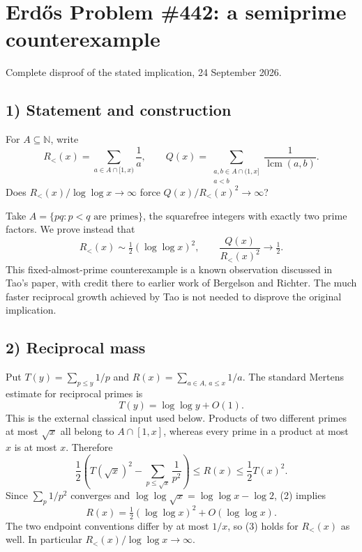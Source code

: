 \section{Erd\H{o}s Problem \#442: a semiprime counterexample}
\noindent Complete disproof of the stated implication, 24 September 2026.

\subsection*{1) Statement and construction}
For $A\subseteq\mathbb N$, write
\[R_<(x)=\sum_{a\in A\cap[1,x)}\frac1a,\qquad
Q(x)=\sum_{\substack{a,b\in A\cap(1,x]\\a<b}}\frac1{\operatorname{lcm}(a,b)}.\]
Does $R_<(x)/\log\log x\to\infty$ force $Q(x)/R_<(x)^2\to\infty$?

Take $A=\{pq:p<q\text{ are primes}\}$, the squarefree integers with exactly two prime factors. We prove instead that
\[R_<(x)\sim\tfrac12(\log\log x)^2,
\qquad \frac{Q(x)}{R_<(x)^2}\longrightarrow\tfrac12.\tag{1}\]
This fixed-almost-prime counterexample is a known observation discussed in Tao's paper, with credit there to earlier work of Bergelson and Richter. The much faster reciprocal growth achieved by Tao is not needed to disprove the original implication.

\subsection*{2) Reciprocal mass}
Put $T(y)=\sum_{p\le y}1/p$ and $R(x)=\sum_{a\in A,\,a\le x}1/a$. The standard Mertens estimate for reciprocal primes is
\[T(y)=\log\log y+O(1).\tag{2}\]
This is the external classical input used below. Products of two different primes at most $\sqrt x$ all belong to $A\cap[1,x]$, whereas every prime in a product at most $x$ is at most $x$. Therefore
\[\frac12\left(T(\sqrt x)^2-\sum_{p\le\sqrt x}\frac1{p^2}\right)
\le R(x)\le\frac12T(x)^2.\]
Since $\sum_p1/p^2$ converges and $\log\log\sqrt x=\log\log x-\log2$, (2) implies
\[R(x)=\tfrac12(\log\log x)^2+O(\log\log x).\tag{3}\]
The two endpoint conventions differ by at most $1/x$, so (3) holds for $R_<(x)$ as well. In particular $R_<(x)/\log\log x\to\infty$.

